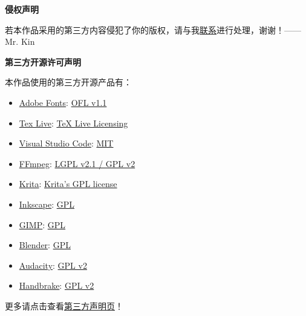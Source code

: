 \begin{center}
    {\bfseries\sffamily\Large 侵权声明}
\end{center}

若本作品采用的第三方内容侵犯了你的版权，请与我\hyperlink{contact}{联系}进行处理，谢谢！——Mr. Kin

\begin{center}
    {\bfseries\sffamily\Large 第三方开源许可声明}
\end{center}

\noindent 本作品使用的第三方开源产品有：
\begin{multicols}{2}
\begin{itemize}
    \item \href{https://github.com/adobe-fonts}{Adobe Fonts}: \href{https://github.com/adobe-fonts/source-serif-pro/blob/release/LICENSE.md}{OFL v1.1}
    \item \href{https://tug.org/texlive/}{Tex Live}: \href{https://tug.org/texlive/copying.html}{TeX Live Licensing}
    \item \href{https://code.visualstudio.com/}{Visual Studio Code}: \href{https://github.com/Microsoft/vscode/blob/master/LICENSE.txt}{MIT}
    \item \href{http://ffmpeg.org/}{FFmpeg}: \href{http://ffmpeg.org/legal.html}{LGPL v2.1 / GPL v2}
    \item \href{https://krita.org/en/}{Krita}: \href{https://docs.krita.org/en/KritaFAQ.html?highlight=license#license-rights-and-the-krita-foundation}{Krita's GPL license}
    \item \href{https://inkscape.org/}{Inkscape}: \href{https://inkscape.org/about/license/}{GPL}
    \item \href{https://www.gimp.org}{GIMP}: \href{https://www.gimp.org/about/COPYING}{GPL}
    \item \href{https://www.blender.org}{Blender}: \href{https://www.blender.org/about/license/}{GPL}
    \item \href{https://www.audacityteam.org/}{Audacity}: \href{https://www.audacityteam.org/about/license/}{GPL v2}
    \item \href{https://handbrake.fr}{Handbrake}: \href{https://github.com/HandBrake/HandBrake/blob/master/LICENSE}{GPL v2}
\end{itemize}
\end{multicols}

\noindent 更多请点击查看\href{https://mister-kin.github.io/about/third-party-declaration/}{第三方声明页}！
